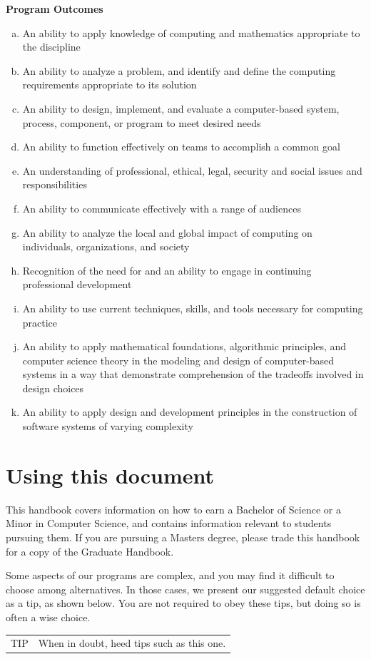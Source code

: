 \documentclass{book}
\newenvironment{tip}
    {\tcolorbox \begin{tabular}{p{2cm} l} \Large{TIP} & }
    {\end{tabular} \endtcolorbox}
\begin{document}
\textbf{Program Outcomes} 
\begin{enumerate}[(a)]
\item An ability to apply knowledge of computing and mathematics appropriate to the discipline
\item An ability to analyze a problem, and identify and define the computing requirements appropriate to its solution
\item An ability to design, implement, and evaluate a computer-based system, process, component, or program to meet desired needs
\item An ability to function effectively on teams to accomplish a common goal
\item An understanding of professional, ethical, legal, security and social issues and responsibilities
\item An ability to communicate effectively with a range of audiences
\item An ability to analyze the local and global impact of computing on individuals, organizations, and society
\item Recognition of the need for and an ability to engage in continuing professional development
\item An ability to use current techniques, skills, and tools necessary for computing practice
\item An ability to apply mathematical foundations, algorithmic principles, and computer science theory in the modeling and design of computer-based systems in a way that demonstrate comprehension of the tradeoffs involved in design choices
\item An ability to apply design and development principles in the construction of software systems of varying complexity
\end{enumerate}

\section{Using this document}

This handbook covers information on how to earn a Bachelor of Science or a Minor in Computer Science, and contains information relevant to students pursuing them. If you are pursuing a Masters degree, please trade this handbook for a copy of the Graduate Handbook.

Some aspects of our programs are complex, and you may find it difficult to choose among alternatives. In those cases, we present our suggested default choice as a tip, as shown below. You are not required to obey these tips, but doing so is often a wise choice.
\begin{tip} \index{tips}
When in doubt, heed tips such as this one.
\end{tip}
\end{document}
